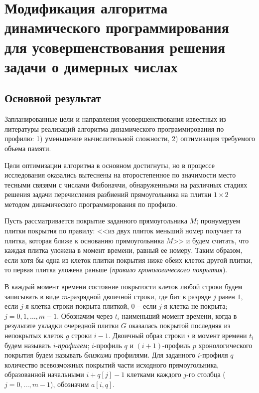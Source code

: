 \chapter{Модификация алгоритма динамического программирования для усовершенствования решения задачи о димерных числах}

\section{Основной результат}

Запланированные цели и направления усовершенствования известных из литературы реализаций алгоритма динамического программирования по профилю: 1) уменьшение вычислительной сложности, 2) оптимизация требуемого объема памяти.

Цели оптимизации алгоритма в основном достигнуты, но в процессе исследования оказались вытеснены на второстепенное по значимости место тесными связями с числами Фибоначчи, обнаруженными на различных стадиях решения задачи перечисления разбиений прямоугольника на плитки $1\times 2$ методом динамического программирования по профилю.

Пусть рассматривается покрытие заданного прямоугольника $M$; пронумеруем плитки покрытия по правилу: <<из двух плиток меньший номер получает та плитка, которая ближе к основанию прямоугольника $M$>> и будем считать, что каждая плитка уложена в момент времени, равный ее номеру. Таким образом, если  хотя бы одна из клеток плитки покрытия ниже обеих клеток другой плитки, то первая плитка уложена раньше  (\textit{правило хронологического покрытия}).

В каждый момент времени состояние покрытости клеток любой строки будем записывать в виде $m$-разрядной двоичной строки, где бит в разряде $j$ равен $1$, если $j$-я клетка строки покрыта плиткой, $0$ -- если $j$-я клетка не покрыта; $j=0,1,\dots,m-1.$  
Обозначим через $t_i$ наименьший момент времени, когда в результате укладки очередной плитки $G$ оказалась покрытой последняя из непокрытых клеток $g$ строки $i-1$.
Двоичный образ строки $i$ в момент времени $t_i$ будем называть $i$-\textit{профилем};
 $i$-профиль $q$ и $(i+1)$-профиль $p$ хронологического покрытия будем называть {\it близкими} профилями.
Для заданного $i$-профиля $q$ количество всевозможных покрытий части исходного прямоугольника, образованной начальными $i+q[j]-1$ клетками каждого $j$-го столбца ($j=0,\dots, m-1$), обозначим $a[i,q]$.

